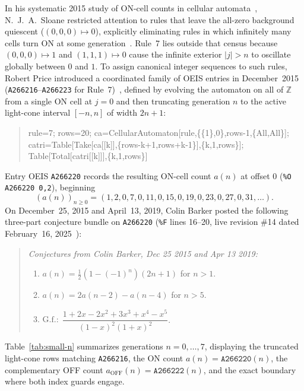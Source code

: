 \documentclass[11pt]{article}
\theoremstyle{definition}
\newcommand{\Z}{\mathbb{Z}}
\newcommand{\seq}[1]{\texttt{#1}}
\begin{document}
In his systematic 2015 study of ON-cell counts in cellular automata~\cite{sloane2015}, N.~J.~A.\ Sloane restricted attention to rules that leave the all-zero background quiescent ($(0, 0, 0) \mapsto 0$), explicitly eliminating rules in which infinitely many cells turn ON at some generation~\cite[\S6.1]{sloane2015}. Rule~7 lies outside that census because $(0, 0, 0) \mapsto 1$ and $(1, 1, 1) \mapsto 0$ cause the infinite exterior $|j| > n$ to oscillate globally between $0$ and $1$. To assign canonical integer sequences to such rules, Robert Price introduced a coordinated family of OEIS entries in December~2015 (\seq{A266216}--\seq{A266223} for Rule~7)~\cite{oeis266220,oeis266222,oeis266216}, defined by evolving the automaton on all of $\Z$ from a single ON cell at $j = 0$ and then truncating generation $n$ to the active light-cone interval $[-n, n]$ of width $2n + 1$:
\begin{quote}\small\ttfamily
rule=7; rows=20; ca=CellularAutomaton[rule,\{\{1\},0\},rows-1,\{All,All\}];\\
catri=Table[Take[ca[[k]],\{rows-k+1,rows+k-1\}],\{k,1,rows\}];\\
Table[Total[catri[[k]]],\{k,1,rows\}]
\end{quote}
Entry OEIS \seq{A266220} records the resulting ON-cell count $a(n)$ at offset $0$ (\texttt{\%O A266220 0,2}), beginning
\[
(a(n))_{n \ge 0} = (1, 2, 0, 7, 0, 11, 0, 15, 0, 19, 0, 23, 0, 27, 0, 31, \dots).
\]
On December~25, 2015 and April~13, 2019, Colin Barker posted the following three-part conjecture bundle on \seq{A266220} (\texttt{\%F} lines 16--20, live revision \#14 dated February~16, 2025~\cite{oeis266220}):
\begin{quote}\itshape
Conjectures from Colin Barker, Dec 25 2015 and Apr 13 2019:
\begin{enumerate}
\item $a(n) = \tfrac{1}{2}(1 - (-1)^n)(2n + 1)$ for $n > 1$.
\item $a(n) = 2a(n - 2) - a(n - 4)$ for $n > 5$.
\item $\mathrm{G.f.:}\; \dfrac{1 + 2x - 2x^2 + 3x^3 + x^4 - x^5}{(1 - x)^2 (1 + x)^2}$.
\end{enumerate}
\end{quote}

Table~\ref{tab:small-n} summarizes generations $n = 0, \dots, 7$, displaying the truncated light-cone rows matching \seq{A266216}, the ON count $a(n) = \seq{A266220}(n)$, the complementary OFF count $a_{\mathrm{OFF}}(n) = \seq{A266222}(n)$, and the exact boundary where both index guards engage.
\end{document}
